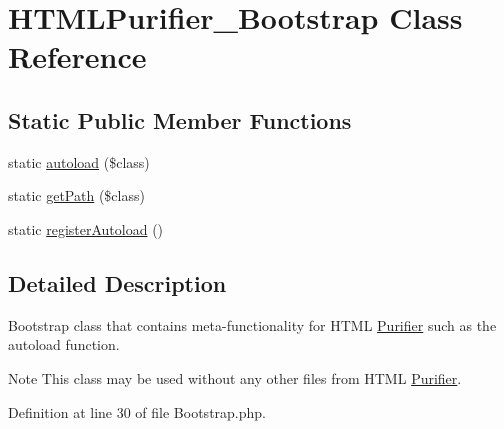 \hypertarget{classHTMLPurifier__Bootstrap}{\section{H\+T\+M\+L\+Purifier\+\_\+\+Bootstrap Class Reference}
\label{classHTMLPurifier__Bootstrap}
}
\subsection*{Static Public Member Functions}
\begin{DoxyCompactItemize}
\item 
static \hyperlink{classHTMLPurifier__Bootstrap_ab47cb9724cee2c9e80e7e54722a1efb0}{autoload} (\$class)
\item 
static \hyperlink{classHTMLPurifier__Bootstrap_a3a182f4ea1128d564bab3f3ea28ec774}{get\+Path} (\$class)
\item 
static \hyperlink{classHTMLPurifier__Bootstrap_a5c0c375718057399820e9d65706dbd7a}{register\+Autoload} ()
\end{DoxyCompactItemize}


\subsection{Detailed Description}
Bootstrap class that contains meta-\/functionality for H\+T\+M\+L \hyperlink{classPurifier}{Purifier} such as the autoload function.

\begin{DoxyNote}{Note}
This class may be used without any other files from H\+T\+M\+L \hyperlink{classPurifier}{Purifier}. 
\end{DoxyNote}


Definition at line 30 of file Bootstrap.\+php.




